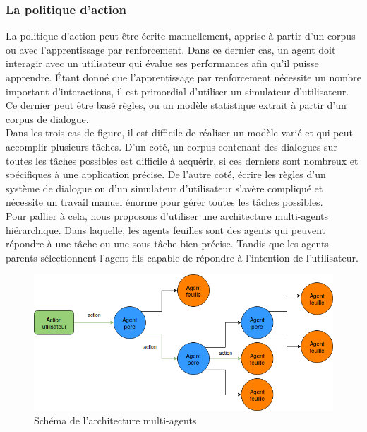 \subsubsection{La politique d'action}
La politique d'action peut être écrite manuellement, apprise à partir d'un corpus ou avec l'apprentissage par renforcement. Dans ce dernier cas, un agent doit interagir avec un utilisateur qui évalue ses performances afin qu'il puisse apprendre. Étant donné que l'apprentissage par renforcement nécessite un nombre important d'interactions, il est primordial d'utiliser un simulateur d'utilisateur. Ce dernier peut être basé règles, ou un modèle statistique extrait à partir d'un corpus de dialogue.\\
Dans les trois cas de figure, il est difficile de réaliser un modèle varié et qui peut accomplir plusieurs tâches. D'un coté, un corpus contenant des dialogues sur toutes les tâches possibles est difficile à acquérir, si ces derniers sont nombreux et spécifiques à une application précise. De l'autre coté, écrire les règles d'un système de dialogue ou d'un simulateur d'utilisateur s'avère compliqué et nécessite un travail manuel énorme pour gérer toutes les tâches possibles.\\
Pour pallier à cela, nous proposons d'utiliser une architecture multi-agents hiérarchique. Dans laquelle, les agents feuilles sont des agents qui peuvent répondre à une tâche ou une sous tâche bien précise. Tandis que les agents parents sélectionnent l'agent fils capable de répondre à l'intention de l'utilisateur.
\begin{figure}[H] 
	
	\centering
	\includegraphics[width=0.6\linewidth]{images/Conception/DM/multiagent.png}
	\caption{Schéma de l'architecture multi-agents}
\end{figure}\label{multiagent}
